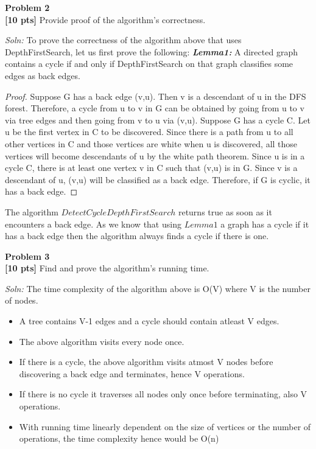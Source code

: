 \documentclass{article}
\newenvironment{problem}[2][Problem]
    { \begin{mdframed}[backgroundcolor=gray!20] \textbf{#1 #2} \\}
    {  \end{mdframed}}
\newenvironment{solution}
    {\textit{Soln:}}
    {}
\begin{document}
\begin{problem}{2}
\textbf{[10 pts]} Provide proof of the algorithm's correctness. 
\end{problem}
\begin{solution}
To prove the correctness of the algorithm above that uses DepthFirstSearch, let us first prove the following:
\newline \textbf{\textit{Lemma1:}} A directed graph contains a cycle if and only if DepthFirstSearch on that graph classifies some edges as back edges.
\begin{proof}
Suppose G has a back edge (v,u).
Then v is a descendant of u in the DFS forest.
Therefore, a cycle from u to v in G can be obtained by going from u to v via tree edges and then going from v to u via (v,u).
Suppose G has a cycle C.
Let u be the first vertex in C to be discovered.
Since there is a path from u to all other vertices in C and those vertices are white when u is discovered, all those vertices will become descendants of u by the white path theorem.
Since u is in a cycle C, there is at least one vertex v in C such that (v,u) is in G.
Since v is a descendant of u, (v,u) will be classified as a back edge. Therefore, if G is cyclic, it has a back edge.\end{proof}
\begin{center}
The algorithm $Detect Cycle Depth First Search$ returns true as soon as it encounters a back edge. As we know that using $Lemma 1$ a graph has a cycle if it has a back edge then the algorithm always finds a cycle if there is one.
\end{center}
\end{solution}

\begin{problem}{3}
\textbf{[10 pts]} Find and prove the algorithm's running time.
\end{problem}
\begin{solution}
The time complexity of the algorithm above is O(V) where V is the number of nodes.
\begin{itemize}
\item A tree contains V-1 edges and a cycle should contain atleast V edges. \item The above algorithm visits every node once.
\item If there is a cycle, the above algorithm visits atmost V nodes before discovering a back edge and terminates, hence V operations.
\item If there is no cycle it traverses all nodes only once before terminating, also V operations.
\item With running time linearly dependent on the size of vertices or the number of operations, the time complexity hence would be O(n)
\end{itemize}
\end{solution}
\end{document}
